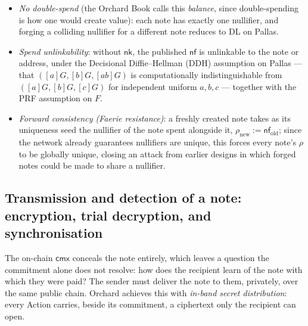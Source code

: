 \documentclass[11pt,a4paper]{article}
\theoremstyle{definition}
\newcommand{\nfsym}{\mathsf{nf}}
\newcommand{\cmx}{\mathsf{cmx}}
\newcommand{\nksym}{\ensuremath{\mathsf{nk}}}
\begin{document}
\begin{itemize}[leftmargin=*]
\item \emph{No double-spend} (the Orchard Book calls this \emph{balance},
since double-spending is how one would create value): each note has exactly
one nullifier, and forging a colliding nullifier for a different note
reduces to DL on Pallas.
\item \emph{Spend unlinkability}: without $\nksym$, the published $\nfsym$
is unlinkable to the note or address, under the Decisional Diffie--Hellman
(DDH) assumption on Pallas --- that $([a]G, [b]G, [ab]G)$ is computationally
indistinguishable from $([a]G, [b]G, [c]G)$ for independent uniform
$a,b,c$ --- together with the PRF assumption on $F$.
\item \emph{Forward consistency (Faerie resistance)}: a freshly created
note takes as its uniqueness seed the nullifier of the note spent alongside it,
$\rho_{\mathrm{new}} := \nfsym_{\mathrm{old}}$; since the network already
guarantees nullifiers are unique, this forces every note's $\rho$ to be
globally unique, closing an attack from earlier designs in which forged
notes could be made to share a nullifier.
\end{itemize}
\subsection{Transmission and detection of a note: encryption, trial decryption, and synchronisation}\label{sec:noteenc}

The on-chain $\cmx$ conceals the note entirely, which leaves a question the
commitment alone does not resolve: how does the recipient learn of the note
with which they were paid? The sender must deliver the note to them, privately, over
the same public chain. Orchard achieves this with \emph{in-band secret
distribution}: every Action carries, beside its commitment, a ciphertext only
the recipient can open.
\end{document}
